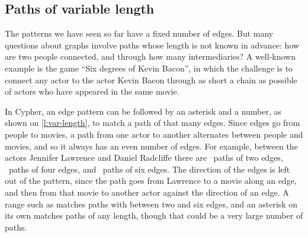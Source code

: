 

\subsection{Paths of variable length}\label{sec:graph-paths}

The patterns we have seen so far have a fixed number of edges.
But many questions about graphs involve paths whose length is not known in advance: how are two people connected, and through how many intermediaries?
A well-known example is the game ``Six degrees of Kevin Bacon'', in which the challenge is to connect any actor to the actor Kevin Bacon through as short a chain as possible of actors who have appeared in the same movie.

In Cypher, an edge pattern can be followed by an asterisk and a number, as shown on \autoref{l:var-length}, to match a path of that many edges.
Since  edges go from people to movies, a path from one actor to another alternates between people and movies, and so it always has an even number of edges.
For example, between the actors Jennifer Lawrence and Daniel Radcliffe there are \graphpathstwo\ paths of two  edges, \graphpathsfour\ paths of four edges, and \graphpathssix\ paths of six edges.
The direction of the edges is left out of the pattern, since the path goes from Lawrence to a movie along an  edge, and then from that movie to another actor against the direction of an  edge.
A range such as  matches paths with between two and six edges, and an asterisk on its own matches paths of any length, though that could be a very large number of paths.

